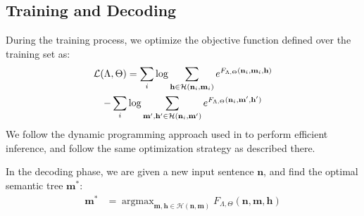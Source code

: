 \documentclass[11pt,a4paper]{article}
\begin{document}
{{\subsection{Training and Decoding}

During the training process, we optimize the objective function defined over the training set as:
\begin{gather}
\mathcal{L}(\Lambda,\Theta)=\sum_{i}\log \sum_{\mathbf{h}\in\mathcal{H}(\mathbf{n}_i,\mathbf{m}_i) }e^{F_{\Lambda,\Theta}(\mathbf{n}_i,\mathbf{m}_i,\mathbf{h})} \notag \\
- \sum_{i}\log \sum_{\mathbf{m}',\mathbf{h}'\in\mathcal{H}(\mathbf{n}_i,\mathbf{m}') }e^{F_{\Lambda,\Theta}(\mathbf{n}_i,\mathbf{m}',\mathbf{h}')}
\label{obj6}
\end{gather} 
We follow the dynamic programming approach used in \cite{Rhs:17} to perform efficient inference, and follow the same optimization strategy as described there.

In the decoding phase, we are given a new input sentence $\mathbf{n}$, and find the optimal semantic tree $\mathbf{m}^{\ast}$:
\begin{align}
\mathbf{m}^{\ast} 
&=\mathop{\arg\max}_{\mathbf{m,h}\in \mathcal{H}(\mathbf{n},\mathbf{m})}{F_{\Lambda, \Theta}(\mathbf{n},\mathbf{m},\mathbf{h})}
\label{argmax}
\end{align}


\begin{table}[t]
	\centering
	\small
	\caption{Performance on development set. $F$: F1-measure (\%).}
	\label{tab:hyperparameter}
\end{table}


}}
\end{document}
